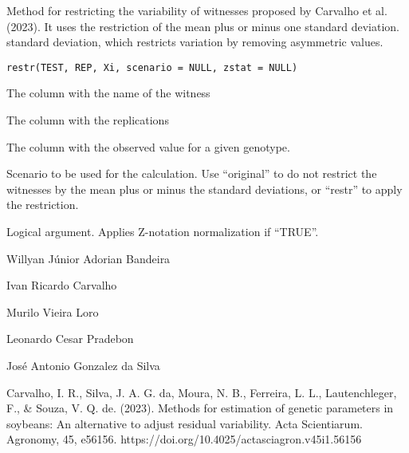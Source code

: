 \documentclass[a4paper]{book}
\begin{document}
%
\begin{Description}
Method for restricting the variability of witnesses proposed by Carvalho et al.
(2023). It uses the restriction of the mean plus or minus one standard deviation.
standard deviation, which restricts variation by removing asymmetric values.
\end{Description}
%
\begin{Usage}
\begin{verbatim}
restr(TEST, REP, Xi, scenario = NULL, zstat = NULL)
\end{verbatim}
\end{Usage}
%
\begin{Arguments}
\begin{ldescription}
\item[\code{TEST}] The column with the name of the witness

\item[\code{REP}] The column with the replications

\item[\code{Xi}] The column with the observed value for a given genotype.

\item[\code{scenario}] Scenario to be used for the calculation. Use “original” to
do not restrict the witnesses by the mean plus or minus the standard deviations,
or “restr” to apply the restriction.

\item[\code{zstat}] Logical argument. Applies Z-notation normalization if “TRUE”.
\end{ldescription}
\end{Arguments}
%
\begin{Author}
Willyan Júnior Adorian Bandeira

Ivan Ricardo Carvalho

Murilo Vieira Loro

Leonardo Cesar Pradebon

José Antonio Gonzalez da Silva
\end{Author}
%
\begin{References}
Carvalho, I. R., Silva, J. A. G. da, Moura, N. B., Ferreira, L. L.,
Lautenchleger, F., \& Souza, V. Q. de. (2023). Methods for estimation of
genetic parameters in soybeans: An alternative to adjust residual variability.
Acta Scientiarum. Agronomy, 45, e56156.
https://doi.org/10.4025/actasciagron.v45i1.56156
\end{References}
%
\end{document}
